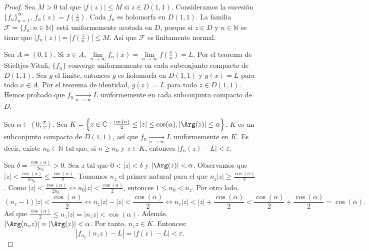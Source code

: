 \begin{proof}
    Sea $M > 0$ tal que $|f(z)| \leq M$ si $z \in D(1, 1)$.
    Consideramos la sucesión $\{f_n\}_{n=1}^\infty$, $f_n(z) = f\left(\frac{z}{n}\right)$.
    Cada $f_n$ es holomorfa en $D(1, 1)$.
    La familia $\mathcal{F} = \{f_n : n \in \mathbb{N}\}$ está uniformemente acotada en $D$, porque si $z \in D$ y $n \in \mathbb{N}$ se tiene que $|f_n(z)| = \left|f\left(\frac{z}{n}\right)\right| \leq M$.
    Así que $\mathcal{F}$ es finitamente normal.

    Sea $A = (0, 1)$.
    Si $x \in A$, $\lim\limits_{n \to \infty} f_n(x) = \lim\limits_{n \to \infty} f\left(\frac{x}{n}\right) = L$.
    Por el teorema de Stieltjes-Vitali, $\{f_n\}$ converge uniformemente en cada subconjunto compacto de $D(1, 1)$.
    Sea $g$ el límite, entonces $g$ es holomorfa en $D(1, 1)$ y $g(x) = L$ para todo $x \in A$.
    Por el teorema de identidad, $g(z) = L$ para todo $z \in D(1, 1)$.
    Hemos probado que $f_n \xrightarrow[n \to \infty]{} L$ uniformemente en cada subconjunto compacto de $D$.

    Sea $\alpha \in (0, \frac{\pi}{2})$.
    Sea $K = \left\{z \in \mathbb{C} : \frac{\cos(\alpha)}{2} \leq |z| \leq \cos(\alpha), |\Arg(z)| \leq \alpha\right\}$.
    $K$ es un subconjunto compacto de $D(1, 1)$, así que $f_n \xrightarrow[n \to \infty]{} L$ uniformemente en $K$.
    Es decir, existe $n_0 \in \mathbb{N}$ tal que, si $n \geq n_0$ y $z \in K$, entonces $|f_n(z)-L| < \varepsilon$.

    Sea $\delta = \frac{\cos(\alpha)}{2n_0} > 0$.
    Sea $z$ tal que $0 < |z| < \delta$ y $|\Arg(z)| < \alpha$.
    Observamos que $|z| < \frac{\cos(\alpha)}{2n_0} \leq \frac{\cos(\alpha)}{2}$.
    Tomamos $n_z$ el primer natural para el que $n_z|z| \geq \frac{\cos(\alpha)}{2}$.
    Como $|z| < \frac{\cos(\alpha)}{2n_0} \Leftrightarrow n_0|z| < \frac{\cos(\alpha)}{2}$, entonces $1 \leq n_0 < n_z$.
    Por otro lado,
    $$(n_z-1)|z| < \frac{\cos(\alpha)}{2} \Leftrightarrow n_z|z| - |z| < \frac{\cos(\alpha)}{2} \Leftrightarrow n_z|z| < |z| + \frac{\cos(\alpha)}{2} < \frac{\cos(\alpha)}{2} + \frac{\cos(\alpha)}{2} = \cos(\alpha).$$
    Así que $\frac{\cos(\alpha)}{2} \leq n_z|z| = |n_zz| < \cos(\alpha)$.
    Además, $|\Arg(n_zz)| = |\Arg(z)| < \alpha$.
    Por tanto, $n_zz \in K$.
    Entonces:
    $$|f_{n_k}(n_zz) - L| = |f(z) - L| < \varepsilon.$$
\end{proof}

